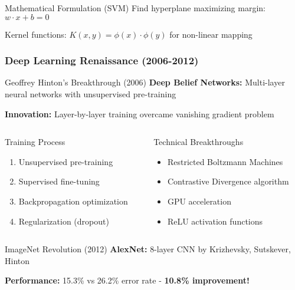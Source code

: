 \documentclass{beamer}
\begin{document}
\begin{frame}
    \begin{block}{Mathematical Formulation (SVM)}
        Find hyperplane maximizing margin: $w \cdot x + b = 0$
        
        Kernel functions: $K(x,y) = \phi(x) \cdot \phi(y)$ for non-linear mapping
    \end{block}
\end{frame}

\begin{frame}
    \frametitle{Deep Learning Renaissance (2006-2012)}
    \begin{block}{Geoffrey Hinton's Breakthrough (2006)}
        \textbf{Deep Belief Networks:} Multi-layer neural networks with unsupervised pre-training
        
        \textbf{Innovation:} Layer-by-layer training overcame vanishing gradient problem
    \end{block}
    
    \begin{columns}
        \begin{column}{0.48\textwidth}
            \begin{alertblock}{Training Process}
                \begin{enumerate}
                    \item Unsupervised pre-training
                    \item Supervised fine-tuning
                    \item Backpropagation optimization
                    \item Regularization (dropout)
                \end{enumerate}
            \end{alertblock}
        \end{column}
        \begin{column}{0.48\textwidth}
            \begin{exampleblock}{Technical Breakthroughs}
                \begin{itemize}
                    \item Restricted Boltzmann Machines
                    \item Contrastive Divergence algorithm
                    \item GPU acceleration
                    \item ReLU activation functions
                \end{itemize}
            \end{exampleblock}
        \end{column}
    \end{columns}
    
    \begin{alertblock}{ImageNet Revolution (2012)}
        \textbf{AlexNet:} 8-layer CNN by Krizhevsky, Sutskever, Hinton
        
        \textbf{Performance:} 15.3\% vs 26.2\% error rate - \textbf{10.8\% improvement!}
    \end{alertblock}
\end{frame}
\end{document}
